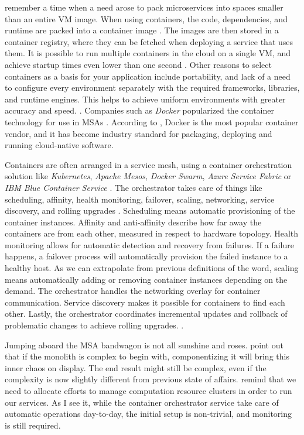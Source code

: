 \documentclass[utf8,english]{gradu3}
\begin{document}
\textcite[18]{Gannon2017} remember a time when a need arose to pack microservices
into spaces smaller than an entire VM image. When using
containers, the code, dependencies, and runtime are packed into a
container image \parencite{Microsoft2022-CNA}. The images are then stored
in a container registry, where they can be fetched when deploying a
service that uses them. It is possible to run multiple containers in the cloud
on a single VM, and achieve startup times even lower than one second
\parencite[18]{Gannon2017}. Other reasons to select containers as a basis for
your application include portability, and lack of a need to configure every
environment separately with the required frameworks, libraries, and runtime
engines. This helps to achieve uniform environments with greater accuracy and
speed. \parencite{Microsoft2022-CNA}. Companies such as \textit{Docker} popularized
the container technology for use in MSAs \parencite[18]{Gannon2017}. According
to \textcite{Microsoft2022-CNA}, Docker is the most popular container vendor, and it
has become industry standard for packaging, deploying and running cloud-native
software.

Containers are often arranged in a service mesh, using a
container orchestration solution like \textit{Kubernetes},
\textit{Apache Mesos}, \textit{Docker Swarm}, \textit{Azure Service Fabric} or
\textit{IBM Blue Container Service} \parencite[18]{Gannon2017}. The orchestrator
takes care of things like scheduling, affinity, health monitoring, failover,
scaling, networking, service discovery, and rolling upgrades
\parencite{Microsoft2022-CNA}. Scheduling means automatic provisioning of
the container instances. Affinity and anti-affinity describe how far
away the containers are from each other, measured in respect to hardware
topology. Health monitoring allows for automatic detection and recovery
from failures. If a failure happens, a failover process will
automatically provision the failed instance to a healthy host. As we can
extrapolate from previous definitions of the word, scaling means
automatically adding or removing container instances depending on the demand.
The orchestrator handles the networking overlay for container
communication. Service discovery makes it possible for containers to
find each other. Lastly, the orchestrator coordinates incremental updates and
rollback of problematic changes to achieve rolling upgrades.
\parencite{Microsoft2022-CNA}.

Jumping aboard the MSA bandwagon is not all sunshine and roses.
\textcite[18]{Li2021} point out that if the monolith is complex to begin with,
componentizing it will bring this inner chaos on display. The end result might
still be complex, even if the complexity is now slightly different from previous state of affairs.
\textcite[20]{Gannon2017} remind
that we need to allocate efforts to manage computation resource clusters in
order to run our services. As I see it, while the container orchestrator service
take care of automatic operations day-to-day, the initial setup is non-trivial,
and monitoring is still required.
\end{document}

